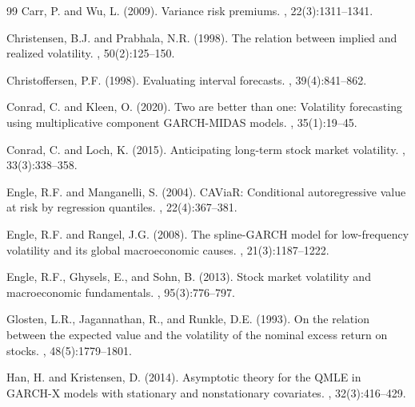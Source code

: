 \documentclass[12pt,a4paper]{article}
\begin{document}
\begin{thebibliography}{99}
Carr, P. and Wu, L. (2009).
\newblock Variance risk premiums.
, 22(3):1311--1341.

Christensen, B.J. and Prabhala, N.R. (1998).
\newblock The relation between implied and realized volatility.
, 50(2):125--150.

Christoffersen, P.F. (1998).
\newblock Evaluating interval forecasts.
, 39(4):841--862.

Conrad, C. and Kleen, O. (2020).
\newblock Two are better than one: Volatility forecasting using multiplicative component GARCH-MIDAS models.
, 35(1):19--45.

Conrad, C. and Loch, K. (2015).
\newblock Anticipating long-term stock market volatility.
, 33(3):338--358.


Engle, R.F. and Manganelli, S. (2004).
\newblock CAViaR: Conditional autoregressive value at risk by regression quantiles.
, 22(4):367--381.

Engle, R.F. and Rangel, J.G. (2008).
\newblock The spline-GARCH model for low-frequency volatility and its global macroeconomic causes.
, 21(3):1187--1222.

Engle, R.F., Ghysels, E., and Sohn, B. (2013).
\newblock Stock market volatility and macroeconomic fundamentals.
, 95(3):776--797.

Glosten, L.R., Jagannathan, R., and Runkle, D.E. (1993).
\newblock On the relation between the expected value and the volatility of the nominal excess return on stocks.
, 48(5):1779--1801.

Han, H. and Kristensen, D. (2014).
\newblock Asymptotic theory for the QMLE in GARCH-X models with stationary and nonstationary covariates.
, 32(3):416--429.


\end{thebibliography}
\end{document}
